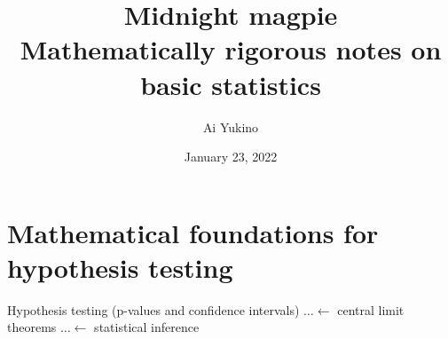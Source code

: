 \documentclass{article}
\begin{document}
\title{Midnight magpie \\
	\large Mathematically rigorous notes on basic statistics}
\author{Ai Yukino}
\date{January 23, 2022}
\maketitle
\hypersetup{linkcolor = internallinkcolor}
\tableofcontents
\hypersetup{linkcolor= .}

\section{Mathematical foundations for hypothesis testing}

Hypothesis testing (p-values and confidence intervals) $\dots \leftarrow$ central limit theorems $\dots \leftarrow$ statistical inference

\end{document}
